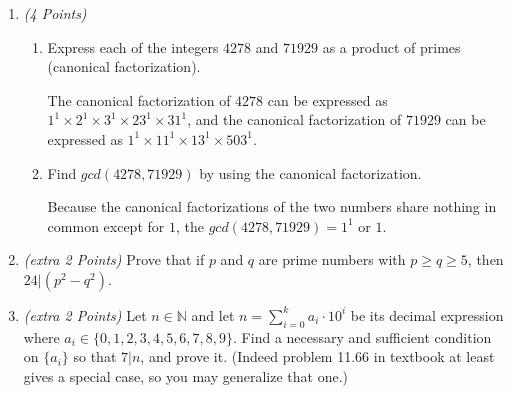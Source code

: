 \documentclass[10pt]{article} %
\newcommand{\N}{\mathbb{N}}
\newcommand{\points}[1]{{\it (#1 Points)}}
\begin{document}
\begin{enumerate}
    \bigskip
    
    \begin{proof} This will be a proof by cases: $x$ is rational, or $x$ is irrational.  
    
    {\bf Case 1:} $x \in \mathbb{I}$ (Irrational)
    
    If $x$ is irrational, then the proof is simple:
    
    Let $y = \frac{1}{2} x$, We know from Result $5.15$ that an irrational number ($x$) multiplied by a rational number($\frac{1}{2}$) is irrational.  Therefore, $y$ is an irrational number between $0$ and $x$.  
    
    {\bf Case 2:} $x \in \mathbb{Q}$ (Rational)
    
    For the second case we can take a number like $\frac{\sqrt{2}}{2}$ which is between $0$ and $1$ and is irrational.  Then there exists the number $y = \frac{\sqrt{2}}{2} x$ which is between $0$ and $x$ and makes $y$ an irrational number.  
    \end{proof}
    
    \bigskip

    \item\points{4}
    \begin{enumerate}
  \item Express each of the integers $4278$ and $71929$ as  a product of primes (canonical factorization).
  
  \bigskip
  
   The canonical factorization of $4278$ can be expressed as $1^1 \times 2^1 \times 3^1 \times 23^1 \times 31^1$, and the canonical factorization of $71929$ can be expressed as $1^1 \times 11^1 \times 13^1 \times 503^1$.  
    
  \bigskip
  
  \item Find $gcd(4278,71929)$ by using the canonical factorization.
  
  \bigskip
  
   Because the canonical factorizations of the two numbers share nothing in common except for $1$, the $gcd(4278,71929) = 1^1$ or $1$.  
  
  \bigskip
  
\end{enumerate}


 \item\points{extra 2} Prove that if $p$ and $q$ are prime numbers with $p\ge q\ge 5$, then $24|(p^2-q^2)$.

\item\points{extra 2} Let $n\in \N$ and let $\displaystyle n=\sum_{i=0}^k a_i \cdot 10^i$ be its decimal expression where $a_i\in \{0,1,2,3,4,5,6,7,8,9\}$. Find a necessary and sufficient condition on $\{a_i\}$ so that $7|n$, and prove it. (Indeed problem 11.66 in textbook at least gives a special case, so you may generalize that one.)

\end{enumerate}
\end{document}
